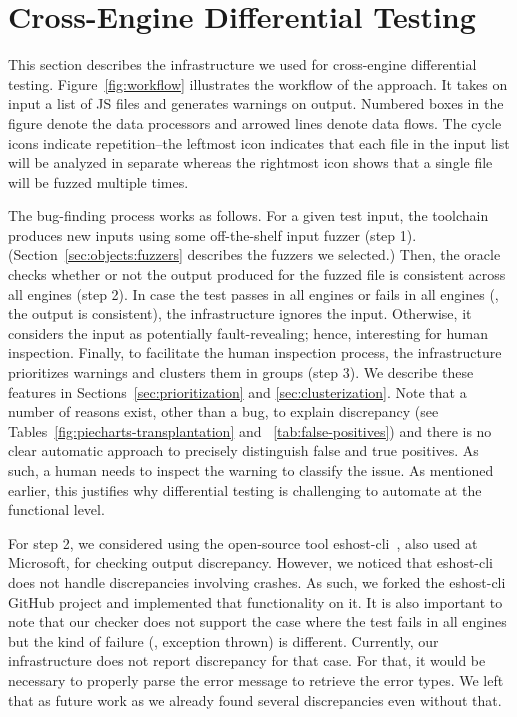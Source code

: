 \documentclass[sigconf,review, anonymous]{acmart}
\begin{document}
\section{Cross-Engine Differential Testing}
\label{sec:design}

This section describes the infrastructure we used for cross-engine
differential testing. Figure~\ref{fig:workflow} illustrates the
workflow of the approach. It takes on input a list of JS files and
generates warnings on output. Numbered boxes in the figure denote the
data processors and arrowed lines denote data flows. The cycle icons
indicate repetition--the leftmost icon indicates that each file in the
input list will be analyzed in separate whereas the rightmost icon
shows that a single file will be fuzzed multiple times.

The bug-finding process works as follows. For a given test input, the
toolchain produces new inputs using some off-the-shelf input fuzzer
(step 1).  (Section~\ref{sec:objects:fuzzers} describes the fuzzers we
selected.)  Then, the oracle checks whether or not the output produced
for the fuzzed file is consistent across all engines (step 2). In case
the test passes in all engines or fails in all engines (\ie{}, the
output is consistent), the infrastructure ignores the
input. Otherwise, it considers the input as potentially
fault-revealing; hence, interesting for human inspection. Finally, to
facilitate the human inspection process, the infrastructure
prioritizes warnings and clusters them in groups (step 3). We describe
these features in Sections~\ref{sec:prioritization} and
\ref{sec:clusterization}. Note that a number of reasons exist, other
than a bug, to explain discrepancy (see
Tables~\ref{fig:piecharts-transplantation} and
~\ref{tab:false-positives}) and there is no clear automatic approach
to precisely distinguish false and true positives. As such, a human
needs to inspect the warning to classify the issue. As mentioned
earlier, this justifies why differential testing is challenging to
automate at the functional level.

For step 2, we considered using the open-source tool
eshost-cli~\cite{eshost-cli}, also used at Microsoft, for checking
output discrepancy. However, we noticed that eshost-cli does not
handle discrepancies involving crashes. As such, we forked the
eshost-cli GitHub project and implemented that functionality on it. It
is also important to note that our checker does not support the case
where the test fails in all engines but the kind of failure (\eg{},
exception thrown) is different. Currently, our infrastructure does not
report discrepancy for that case. For that, it would be necessary to
properly parse the error message to retrieve the error types. We left
that as future work as we already found several discrepancies even
without that.
\end{document}
